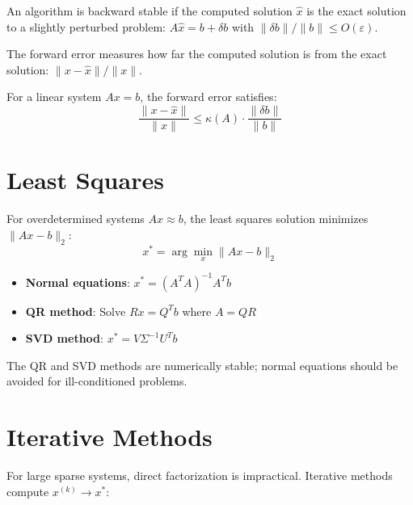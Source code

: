 \begin{definition}
An algorithm is backward stable if the computed solution $\hat{x}$ is the exact solution to a slightly perturbed problem: $A\hat{x} = b + \delta b$ with $\|\delta b\| / \|b\| \leq O(\varepsilon)$.
\end{definition}

\begin{definition}
The forward error measures how far the computed solution is from the exact solution: $\|x - \hat{x}\| / \|x\|$.
\end{definition}

For a linear system $Ax = b$, the forward error satisfies:
$$\frac{\|x - \hat{x}\|}{\|x\|} \leq \kappa(A) \cdot \frac{\|\delta b\|}{\|b\|}$$


\section{Least Squares}
\label{app:linalg:ls}

For overdetermined systems $Ax \approx b$, the least squares solution minimizes $\|Ax - b\|_2$:
$$x^* = \arg\min_x \|Ax - b\|_2$$

\begin{itemize}
    \item \textbf{Normal equations}: $x^* = (A^TA)^{-1}A^Tb$
    \item \textbf{QR method}: Solve $Rx = Q^Tb$ where $A = QR$
    \item \textbf{SVD method}: $x^* = V\Sigma^{-1}U^Tb$
\end{itemize}

The QR and SVD methods are numerically stable; normal equations should be avoided for ill-conditioned problems.


\section{Iterative Methods}
\label{app:linalg:iterative}

For large sparse systems, direct factorization is impractical. Iterative methods compute $x^{(k)} \to x^*$:

